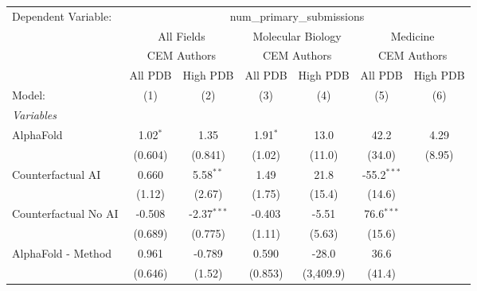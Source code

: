 \begingroup
\centering
\begin{tabular}{lcccccc}
   \tabularnewline \midrule \midrule
   Dependent Variable: & \multicolumn{6}{c}{num\_primary\_submissions}\\
 & \multicolumn{2}{c}{All Fields} & \multicolumn{2}{c}{Molecular Biology} & \multicolumn{2}{c}{Medicine} \\
\cmidrule(lr){2-3} \cmidrule(lr){4-5} \cmidrule(lr){6-7}
 & \multicolumn{2}{c}{CEM Authors} & \multicolumn{2}{c}{CEM Authors} & \multicolumn{2}{c}{CEM Authors} \\
\cmidrule(lr){2-3} \cmidrule(lr){4-5} \cmidrule(lr){6-7}
 & \multicolumn{1}{c}{All PDB} & \multicolumn{1}{c}{High PDB} & \multicolumn{1}{c}{All PDB} & \multicolumn{1}{c}{High PDB} & \multicolumn{1}{c}{All PDB} & \multicolumn{1}{c}{High PDB} \\
\cmidrule(lr){2-2} \cmidrule(lr){3-3} \cmidrule(lr){4-4} \cmidrule(lr){5-5} \cmidrule(lr){6-6} \cmidrule(lr){7-7}
   Model:                                                     & (1)         & (2)           & (3)        & (4)       & (5)           & (6)\\  
   \midrule
   \emph{Variables}\\
   AlphaFold                                                  & 1.02$^{*}$  & 1.35          & 1.91$^{*}$ & 13.0      & 42.2          & 4.29\\   
                                                              & (0.604)     & (0.841)       & (1.02)     & (11.0)    & (34.0)        & (8.95)\\   
   Counterfactual AI                                          & 0.660       & 5.58$^{**}$   & 1.49       & 21.8      & -55.2$^{***}$ &   \\   
                                                              & (1.12)      & (2.67)        & (1.75)     & (15.4)    & (14.6)        &   \\   
   Counterfactual No AI                                       & -0.508      & -2.37$^{***}$ & -0.403     & -5.51     & 76.6$^{***}$  &   \\   
                                                              & (0.689)     & (0.775)       & (1.11)     & (5.63)    & (15.6)        &   \\   
   AlphaFold - Method                                         & 0.961       & -0.789        & 0.590      & -28.0     & 36.6          &   \\   
                                                              & (0.646)     & (1.52)        & (0.853)    & (3,409.9) & (41.4)        &   \\   

\end{tabular}
